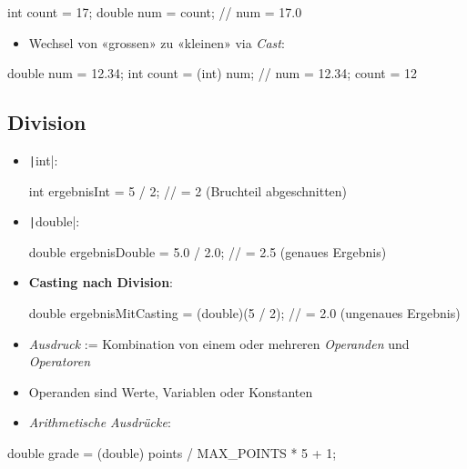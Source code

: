 \documentclass[a4paper,10pt, dvipsnames]{report}
\begin{document}
\begin{javacodebox}
int count = 17;
double num = count; // num = 17.0
\end{javacodebox}

\begin{itemize}
	\item Wechsel von «grossen» zu «kleinen» via \textit{Cast}:
\end{itemize}

\begin{javacodebox}
double num = 12.34;
int count = (int) num; // num = 12.34; count = 12
\end{javacodebox}

\subsection{Division}

\begin{itemize}
    \item \texttt|int|:
    \begin{javacodebox}
int ergebnisInt = 5 / 2; // = 2 (Bruchteil abgeschnitten)
    \end{javacodebox}

    \item \texttt|double|:
    \begin{javacodebox}
double ergebnisDouble = 5.0 / 2.0; // = 2.5 (genaues Ergebnis)
    \end{javacodebox}

    \item \textbf{Casting nach Division}:
    \begin{javacodebox}
double ergebnisMitCasting = (double)(5 / 2); // = 2.0 (ungenaues Ergebnis)
    \end{javacodebox}
\end{itemize}


\begin{itemize}
	\item \textit{Ausdruck} := Kombination von einem oder mehreren \textit{Operanden} und \textit{Operatoren}
	\item Operanden sind Werte, Variablen oder Konstanten
	\item \textit{Arithmetische Ausdrücke}:
\end{itemize}

\begin{javacodebox}
double grade = (double) points / MAX_POINTS * 5 + 1;
\end{javacodebox}
\end{document}
